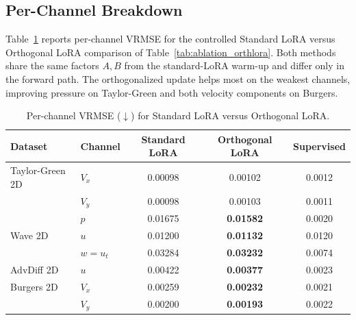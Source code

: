\documentclass{article}
\begin{document}
\subsection{Per-Channel Breakdown}
\label{app:per_channel}

Table~\ref{tab:app_per_channel} reports per-channel VRMSE for the controlled Standard LoRA versus Orthogonal LoRA comparison of Table~\ref{tab:ablation_orthlora}. Both methods share the same factors $A,B$ from the standard-LoRA warm-up and differ only in the forward path. The orthogonalized update helps most on the weakest channels, improving pressure on Taylor-Green and both velocity components on Burgers.

\begin{table}[h]
\centering
\caption{Per-channel VRMSE ($\downarrow$) for Standard LoRA versus Orthogonal LoRA.}
\label{tab:app_per_channel}
\begin{tabular}{llccc}
\toprule
Dataset & Channel & Standard LoRA & Orthogonal LoRA & Supervised \\
\midrule
Taylor-Green 2D & $V_x$    & 0.00098 & 0.00102 & 0.0012 \\
                & $V_y$    & 0.00098 & 0.00103 & 0.0011 \\
                & $p$      & 0.01675 & \textbf{0.01582} & 0.0020 \\
\midrule
Wave 2D         & $u$      & 0.01200 & \textbf{0.01132} & 0.0120 \\
                & $w=u_t$  & 0.03284 & \textbf{0.03232} & 0.0074 \\
\midrule
AdvDiff 2D      & $u$      & 0.00422 & \textbf{0.00377} & 0.0023 \\
\midrule
Burgers 2D      & $V_x$    & 0.00259 & \textbf{0.00232} & 0.0021 \\
                & $V_y$    & 0.00200 & \textbf{0.00193} & 0.0022 \\
\bottomrule
\end{tabular}
\end{table}


\newpage

\end{document}
